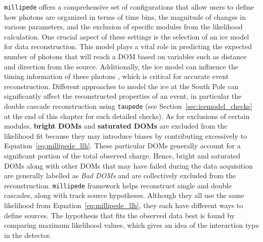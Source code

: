 \texttt{millipede} offers a comprehensive set of configurations that allow users to define how photons are organized in terms of time bins, the magnitude of changes in various parameters, and the exclusion of specific modules from the likelihood calculation. One crucial aspect of these settings is the selection of an ice model for data reconstruction. This model plays a vital role in predicting the expected number of photons that will reach a DOM based on variables such as distance and direction from the source. Additionally, the ice model can influence the timing information of these photons , which is critical for accurate event reconstruction. Different approaches to model the ice at the South Pole can significantly affect the reconstructed properties of an event, in particular the double cascade reconstruction using \texttt{taupede} (see Section~\ref{sec:icemodel_checks} at the end of this chapter for such detailed checks). As for exclusions of certain modules, \textbf{bright DOMs} and \textbf{saturated DOMs} are excluded from the likelihood fit because they may introduce biases by contributing excessively to Equation~\ref{eq:millipede_llh}. These particular DOMs generally account for a significant portion of the total observed charge. Hence, bright and saturated DOMs along with other DOMs that may have failed during the data acquisition are generally labelled as \emph{Bad DOMs} and are collectively excluded from the reconstruction. \texttt{millipede} framework helps reconstruct single and double cascades, along with track source hypotheses. Although they all use the same likelihood from Equation~\ref{eq:millipede_llh}, they each have different ways to define sources. The hypothesis that fits the observed data best is found by comparing maximum likelihood values, which gives an idea of the interaction type in the detector.


